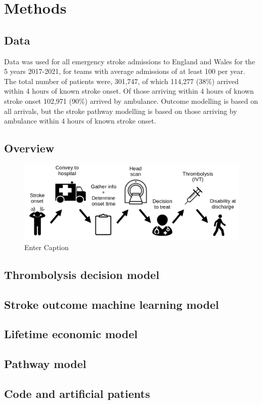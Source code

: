 \section{Methods}

\subsection{Data}

Data was used for all emergency stroke admissions to England and Wales for the 5 years 2017-2021, for teams with average admissions of at least 100 per year. The total number of patients were, 301,747, of which 114,277 (38\%) arrived within 4 hours of known stroke onset. Of those arriving within 4 hours of known stroke onset 102,971 (90\%) arrived by ambulance. Outcome modelling is based on all arrivals, but the stroke pathway modelling is based on those arriving by ambulance within 4 hours of known stroke onset.



\subsection{Overview}

\begin{figure}
    \centering
    \includegraphics[width=0.75\linewidth]{images/flow}
    \caption{Enter Caption}
    \label{flow}
\end{figure}

\subsection{Thrombolysis decision model}

\subsection{Stroke outcome machine learning model}

\subsection{Lifetime economic model}

\subsection{Pathway model}

\subsection{Code and artificial patients}